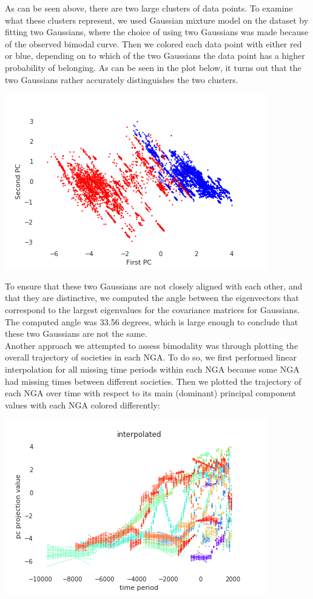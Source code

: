 \documentclass[11pt]{article}
\begin{document}
As can be seen above, there are two large clusters of data points. To examine what these clusters represent, we used Gaussian mixture model on the dataset by fitting two Gaussians, where the choice of using two Gaussians was made because of the observed bimodal curve. Then we colored each data point with either red or blue, depending on to which of the two Gaussians the data point has a higher probability of belonging. As can be seen in the plot below, it turns out that the two Gaussians rather accurately distinguishes the two clusters. 

\begin{center}
	\includegraphics[scale=0.55]{two_pc.png}
\end{center}

To ensure that these two Gaussians are not closely aligned with each other, and that they are distinctive, we computed the angle between the eigenvectors that correspond to the largest eigenvalues for the covariance matrices for Gaussians. The computed angle was 33.56 degrees, which is large enough to conclude that these two Gaussians are not the same. \\

Another approach we attempted to assess bimodality was through plotting the overall trajectory of societies in each NGA. To do so, we first performed linear interpolation for all missing time periods within each NGA because some NGA had missing times between different societies. Then we plotted the trajectory of each NGA over time with respect to its main (dominant) principal component values with each NGA colored differently:

\begin{center}
	\includegraphics[scale=0.75]{interpolated_scatter.png}
\end{center}
\end{document}
